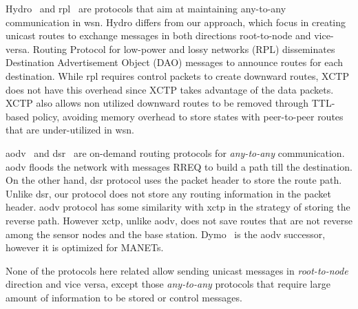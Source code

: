 Hydro~\cite{hydro} and \ac{rpl}~\cite{RPL} are protocols that aim at
maintaining any-to-any communication in \ac{wsn}. Hydro differs from
our approach, which focus in creating unicast routes to exchange
messages in both directions root-to-node and vice-versa. Routing
Protocol for low-power and lossy networks (RPL) disseminates
Destination Advertisement Object (DAO) messages to announce routes
for each destination. While \ac{rpl} requires control packets to
create downward routes, XCTP does not have this overhead since XCTP
takes advantage of the data packets. XCTP also allows non utilized
downward routes to be removed through TTL-based policy, avoiding
memory overhead to store states with peer-to-peer routes that are
under-utilized in \ac{wsn}.


\ac{aodv}~\cite{AODV} and \ac{dsr}~\cite{DSR} are on-demand routing
protocols for \textit{any-to-any} communication. \ac{aodv} floods
the network with messages RREQ to build a path till the destination.
On the other hand, \ac{dsr} protocol uses the packet header to store
the route path. Unlike \ac{dsr}, our protocol does not store any
routing information in the packet header. \ac{aodv} protocol has
some similarity with \ac{xctp} in the strategy of storing the
reverse path. However \ac{xctp}, unlike \ac{aodv}, does not save
routes that are not reverse among the sensor nodes and the base
station. Dymo~\cite{dymo} is the \ac{aodv} successor, however it is
optimized for MANETs.


None of the protocols here related allow sending unicast messages in
 \textit{root-to-node} direction and vice versa, except those
 \textit{any-to-any} protocols that require large amount of information to be stored or control messages.
